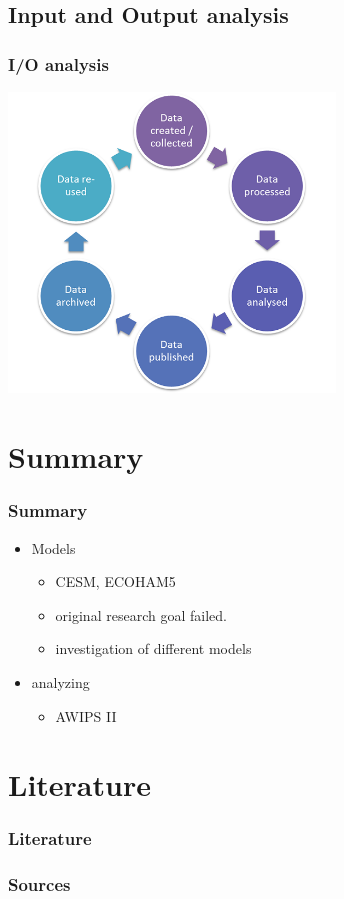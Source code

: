 \documentclass[compress]{beamer}
\begin{document}
\subsection{Input and Output analysis}
\begin{frame}[fragile]
	\frametitle{I/O analysis}
	\begin{center}
	\includegraphics[width=0.65\textwidth]{gfx/DataLifecycle.png}
	\end{center}

\end{frame}


\section{Summary}

\begin{frame}
	\frametitle{Summary}

	\begin{itemize}
		\item Models
		\begin{itemize}
			\item CESM, ECOHAM5
			\item original research goal failed.
			\item investigation of different models
		\end{itemize}

		\item analyzing
		\begin{itemize}
		    \item AWIPS II
		\end{itemize}
	\end{itemize}
\end{frame}

\section*{Literature}

\begin{frame}[allowframebreaks]
	\frametitle{Literature}
    \frametitle{Sources}

	
	
\end{frame}
\end{document}
